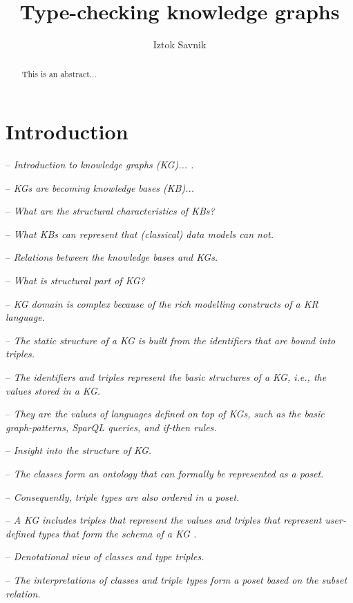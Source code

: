 \documentclass[runningheads]{llncs}
\newcommand{\notes}[1]{\noindent\begin{small}-- \emph{#1}\hfill\break\end{small}}
\begin{document}
\title{Type-checking knowledge graphs}

\author{Iztok Savnik} 



\maketitle

\begin{abstract}
This is an abstract...
\end{abstract}

\newpage
\tableofcontents
\newpage

\thispagestyle{headings}




\section{Introduction}

\notes{Introduction to knowledge graphs (KG)... \cite{Hogan2022,Ehrlinger2016}.}
\notes{KGs are becoming knowledge bases (KB)...}
\notes{What are the structural characteristics of KBs?}
\notes{What KBs can represent that (classical) data models can not.}
\notes{Relations between the knowledge bases and KGs.}

\notes{What is structural part of KG?}
\notes{KG domain is complex because of the rich modelling constructs of a KR language.}
\notes{The static structure of a KG is built from the identifiers that are bound into triples.}
\notes{The identifiers and triples represent the basic structures of a KG, i.e., the values stored in a KG.}
\notes{They are the values of languages defined on top of KGs, such as the basic graph-patterns, SparQL queries, and if-then rules.}
\notes{Insight into the structure of KG.}
\notes{The classes form an ontology that can formally be represented as a poset.}
\notes{Consequently, triple types are also ordered in a poset.}
\notes{A KG includes triples that represent the values and triples that represent user-defined types that form the schema of a KG \cite{Savnik2022}.}
\notes{Denotational view of classes and type triples.}
\notes{The interpretations of classes and triple types form a poset based on the subset relation.}
\end{document}
